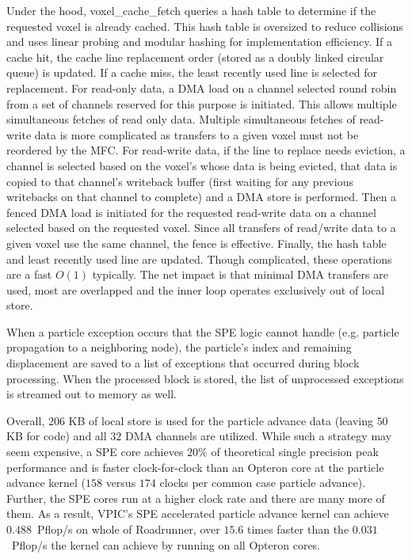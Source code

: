 \documentclass[journal,twoside]{IEEEtran}
\begin{document}
Under the hood, voxel\_cache\_fetch queries a hash table to determine
if the requested voxel is already cached.  This hash table is
oversized to reduce collisions and uses linear probing and modular
hashing for implementation efficiency.  If a cache hit, the cache line
replacement order (stored as a doubly linked circular queue) is
updated.  If a cache miss, the least recently used line is selected
for replacement.  For read-only data, a DMA load on a channel selected
round robin from a set of channels reserved for this purpose is
initiated.  This allows multiple simultaneous fetches of read only
data.  Multiple simultaneous fetches of read-write data is more
complicated as transfers to a given voxel must not be reordered by the
MFC.  For read-write data, if the line to replace needs eviction, a
channel is selected based on the voxel's whose data is being evicted,
that data is copied to that channel's writeback buffer (first waiting
for any previous writebacks on that channel to complete) and a DMA
store is performed.  Then a fenced DMA load is initiated for the
requested read-write data on a channel selected based on the requested
voxel.  Since all transfers of read/write data to a given voxel use
the same channel, the fence is effective.  Finally, the hash table and
least recently used line are updated.  Though complicated, these
operations are a fast $O(1)$ typically.  The net impact is that
minimal DMA transfers are used, most are overlapped and the inner loop
operates exclusively out of local store.


When a particle exception occurs that the SPE logic cannot handle
(e.g. particle propagation to a neighboring node), the particle's
index and remaining displacement are saved to a list of exceptions
that occurred during block processing.  When the processed block is
stored, the list of unprocessed exceptions
is streamed out to memory as well.


Overall, $206$ KB of local store is used for the particle advance data
(leaving $50$ KB for code) and all $32$ DMA channels are utilized.
While such a strategy may seem expensive, a SPE core achieves $20\%$
of theoretical single precision peak performance and is faster
clock-for-clock than an Opteron core at the particle advance kernel
($158$ versus $174$ clocks per common case particle advance).
Further, the SPE cores run at a higher clock rate and there are many
more of them.  As a result, VPIC's SPE accelerated particle advance
kernel can achieve $0.488$~Pflop/s on whole of Roadrunner, over $15.6$
times faster than the $0.031$~Pflop/s the kernel can achieve by
running on all Opteron cores.
\end{document}
